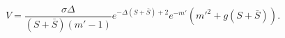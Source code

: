 \begin{equation}
V = \frac{\sigma \Delta}{(S+\bar S)(m'-1)}e^{-\Delta (S + \bar S)+2}
e^{-m'} (m'^2+g(S+\bar S))  .
\end{equation}

